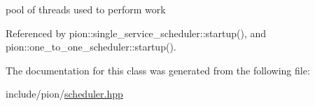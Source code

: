 pool of threads used to perform work 



Referenced by pion\-::single\-\_\-service\-\_\-scheduler\-::startup(), and pion\-::one\-\_\-to\-\_\-one\-\_\-scheduler\-::startup().



The documentation for this class was generated from the following file\-:\begin{DoxyCompactItemize}
\item 
include/pion/\hyperlink{scheduler_8hpp}{scheduler.\-hpp}\end{DoxyCompactItemize}
